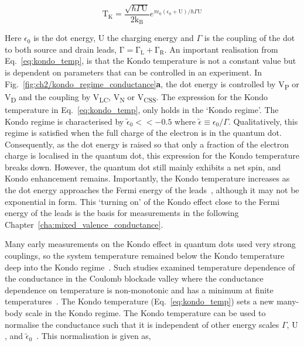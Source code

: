 \begin{equation}\label{eq:kondo_temp}
 \mathrm{T_K} = 
 \frac{\sqrt{\hbar\Gamma \mathrm{U}}}{2\mathrm{k_B}}
 e^{\pi \epsilon_0 (\epsilon_0 + \mathrm{U})/\hbar\Gamma\mathrm{U}}
\end{equation}

 \noindent Here $\epsilon_0$ is the dot energy, $\mathrm{U}$ the charging energy and $\Gamma$ is the coupling of the dot to both source and drain leads, $\mathrm{\Gamma = \Gamma_L + \Gamma_R}$. 
 An important realisation from Eq.~\ref{eq:kondo_temp}, is that the Kondo temperature is not a constant value but is dependent on parameters that can be controlled in an experiment. 
 In Fig.~\ref{fig:ch2/kondo_regime_conductance}\textbf{a}, the dot energy is controlled by V\textsubscript{P} or V\textsubscript{D} and the coupling by V\textsubscript{LC}, V\textsubscript{N} or V\textsubscript{CSS}.
The expression for the Kondo temperature in Eq.~\ref{eq:kondo_temp}, only holds in the `Kondo regime'. The Kondo regime is characterised by $\tilde{\epsilon}_0<<-0.5$ where $\tilde{\epsilon}\equiv \epsilon_0/\Gamma$. Qualitatively, this regime is satisfied when the full charge of the electron is in the quantum dot. Consequently, as the dot energy is raised so that only a fraction of the electron charge is localised in the quantum dot, this expression for the Kondo temperature breaks down. However, the quantum dot still mainly exhibits a net spin, and Kondo enhancement remains. Importantly, the Kondo temperature increases as the dot energy approaches the Fermi energy of the leads~\cite{goldhaber_mv}, although it may not be exponential in form. This `turning on' of the Kondo effect close to the Fermi energy of the leads is the basis for measurements in the following Chapter~\ref{cha:mixed_valence_conductance}.
 

Many early measurements on the Kondo effect in quantum dots used very strong couplings, so the system temperature remained below the Kondo temperature deep into the Kondo regime~\cite{kondo_unitary}. Such studies examined temperature dependence of the conductance in the Coulomb blockade valley where the conductance dependence on temperature is non-monotonic and has a minimum at finite temperatures~\cite{Pustilnik2004}. The Kondo temperature (Eq.~\ref{eq:kondo_temp}) sets a new many-body scale in the Kondo regime. The Kondo temperature can be used to normalise the conductance such that it is independent of other energy scales $\Gamma$, $\mathrm{U}$, and $\tilde{\epsilon}_0$~\cite{costi_kondo_mv_eo_regime}. This normalisation is given as, 

